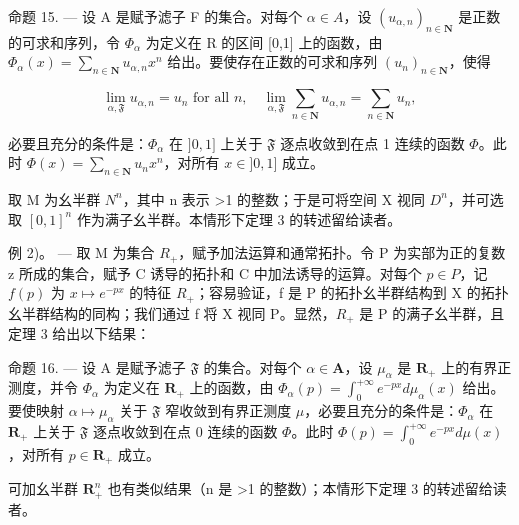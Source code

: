 命题 15. --- 设 A 是赋予滤子 F 的集合。对每个 \(\alpha\in A\)，设 \((u_{\alpha,n})_{n\in\mathbf{N}}\) 是正数的可求和序列，令 \(\Phi_{\alpha}\) 为定义在 R 的区间 {[}0,1{]} 上的函数，由 \(\Phi_{\alpha}(x)=\sum_{n\in\mathbf{N}}u_{\alpha,n}x^{n}\) 给出。要使存在正数的可求和序列 \((u_{n})_{n\in\mathbf{N}}\)，使得

\[
\lim _ {\alpha , \mathfrak {F}} u _ {\alpha , n} = u _ {n} \text {   for   all   } n, \quad \lim _ {\alpha , \mathfrak {F}} \sum_ {n \in \mathbf {N}} u _ {\alpha , n} = \sum_ {n \in \mathbf {N}} u _ {n},
\]

必要且充分的条件是：\(\Phi_{\alpha}\) 在 \(]0,1]\) 上关于 \(\mathfrak{F}\) 逐点收敛到在点 1 连续的函数 \(\Phi\)。此时 \(\Phi(x) = \sum_{n \in \mathbf{N}} u_n x^n\)，对所有 \(x \in ]0,1]\) 成立。

取 M 为幺半群 \(N^{n}\)，其中 n 表示 \textgreater1 的整数；于是可将空间 X 视同 \(D^{n}\)，并可选取 \([0,1]^{n}\) 作为满子幺半群。本情形下定理 3 的转述留给读者。

例 2)。 --- 取 M 为集合 \(R_{+}\)，赋予加法运算和通常拓扑。令 P 为实部为正的复数 z 所成的集合，赋予 C 诱导的拓扑和 C 中加法诱导的运算。对每个 \(p \in P\)，记 \(f(p)\) 为 \(x \mapsto e^{-px}\) 的特征 \(R_{+}\)；容易验证，f 是 P 的拓扑幺半群结构到 X 的拓扑幺半群结构的同构；我们通过 f 将 X 视同 P。显然，\(R_{+}\) 是 P 的满子幺半群，且定理 3 给出以下结果：

命题 16. --- 设 A 是赋予滤子 \(\mathfrak{F}\) 的集合。对每个 \(\alpha \in \mathbf{A}\)，设 \(\mu_{\alpha}\) 是 \(\mathbf{R}_{+}\) 上的有界正测度，并令 \(\Phi_{\alpha}\) 为定义在 \(\mathbf{R}_{+}\) 上的函数，由 \(\Phi_{\alpha}(p) = \int_{0}^{+\infty} e^{-px} d\mu_{\alpha}(x)\) 给出。要使映射 \(\alpha \mapsto \mu_{\alpha}\) 关于 \(\mathfrak{F}\) 窄收敛到有界正测度 \(\mu\)，必要且充分的条件是：\(\Phi_{\alpha}\) 在 \(\mathbf{R}_{+}\) 上关于 \(\mathfrak{F}\) 逐点收敛到在点 0 连续的函数 \(\Phi\)。此时 \(\Phi(p) = \int_{0}^{+\infty} e^{-px} d\mu(x)\)，对所有 \(p \in \mathbf{R}_{+}\) 成立。

可加幺半群 \(\mathbf{R}_{+}^{n}\) 也有类似结果（n 是 \textgreater1 的整数）；本情形下定理 3 的转述留给读者。


